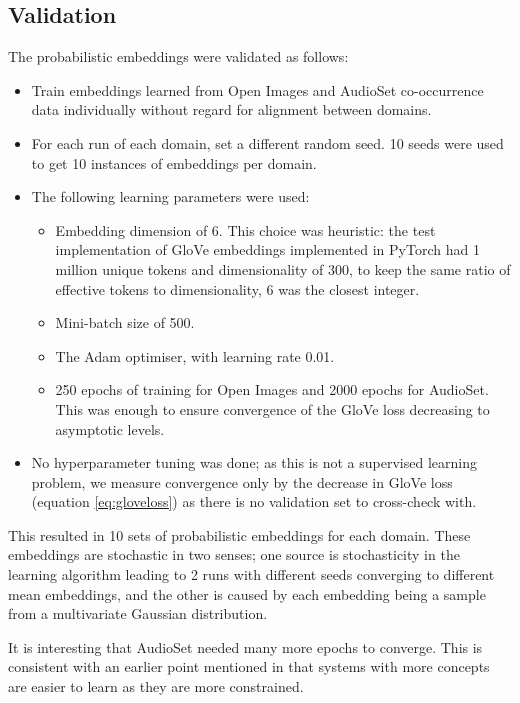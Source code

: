 \subsection{Validation}

The probabilistic embeddings were validated as follows:

\begin{itemize}
    \item Train embeddings learned from Open Images and AudioSet co-occurrence data individually without regard for alignment between domains.
    \item For each run of each domain, set a different random seed. 10 seeds were used to get 10 instances of embeddings per domain.
    \item The following learning parameters were used:
    \begin{itemize}
        \item Embedding dimension of 6. This choice was heuristic: the test implementation of GloVe embeddings implemented in PyTorch had 1 million unique tokens and dimensionality of 300, to keep the same ratio of effective tokens to dimensionality, 6 was the closest integer. 
        \item Mini-batch size of 500.
        \item The Adam \cite{kingma2017adam} optimiser, with learning rate 0.01.
        \item 250 epochs of training for Open Images and 2000 epochs for AudioSet. This was enough to ensure convergence of the GloVe loss decreasing to asymptotic levels. 
    \end{itemize}
    \item No hyperparameter tuning was done; as this is not a supervised learning problem, we measure convergence only by the decrease in GloVe loss (equation \ref{eq:gloveloss}) as there is no validation set to cross-check with. 
\end{itemize}

This resulted in 10 sets of probabilistic embeddings for each domain. These embeddings are stochastic in two senses; one source is stochasticity in the learning algorithm leading to 2 runs with different seeds converging to different mean embeddings, and the other is caused by each embedding being a sample from a multivariate Gaussian distribution. 

It is interesting that AudioSet needed many more epochs to converge. This is consistent with an earlier point mentioned in \cite{GOLDSTONE2002295} that systems with more concepts are easier to learn as they are more constrained. 

